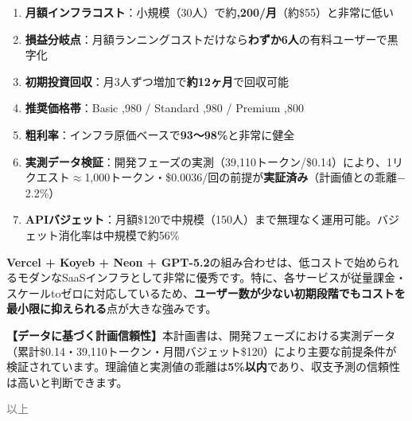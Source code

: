\documentclass[a4paper,11pt]{ltjsarticle}
\begin{document}
\begin{tcolorbox}[
  colback=profitgreen!5,
  colframe=profitgreen,
  boxrule=1.5pt,
  title={\textbf{\Large 結論}},
  coltitle=white,
  fonttitle=\bfseries,
]

\begin{enumerate}[leftmargin=2em]
  \item \textbf{月額インフラコスト}：小規模（30人）で約\textbf{,200/月}（約\$55）と非常に低い
  \item \textbf{損益分岐点}：月額ランニングコストだけなら\textbf{わずか6人}の有料ユーザーで黒字化
  \item \textbf{初期投資回収}：月3人ずつ増加で\textbf{約12ヶ月}で回収可能
  \item \textbf{推奨価格帯}：Basic ,980 / Standard ,980 / Premium ,800
  \item \textbf{粗利率}：インフラ原価ベースで\textbf{93〜98\%}と非常に健全
  \item \textbf{実測データ検証}：開発フェーズの実測（39,110トークン/\$0.14）により、1リクエスト$\approx$1,000トークン・\$0.0036/回の前提が\textbf{実証済み}（計画値との乖離$-$2.2\%）
  \item \textbf{APIバジェット}：月額\$120で中規模（150人）まで無理なく運用可能。バジェット消化率は中規模で約56\%
\end{enumerate}

\vspace{0.5em}
\textbf{Vercel + Koyeb + Neon + GPT-5.2}の組み合わせは、低コストで始められるモダンなSaaSインフラとして非常に優秀です。特に、各サービスが従量課金・スケールtoゼロに対応しているため、\textbf{ユーザー数が少ない初期段階でもコストを最小限に抑えられる}点が大きな強みです。

\vspace{0.5em}
\textbf{【データに基づく計画信頼性】}本計画書は、開発フェーズにおける実測データ（累計\$0.14・39,110トークン・月間バジェット\$120）により主要な前提条件が検証されています。理論値と実測値の乖離は\textbf{5\%以内}であり、収支予測の信頼性は高いと判断できます。

\end{tcolorbox}

\vspace{1cm}

\begin{flushright}
\textcolor{gray}{\small 以上}
\end{flushright}
\end{document}
